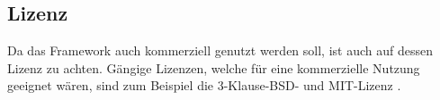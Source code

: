 \subsection{Lizenz}
Da das Framework auch kommerziell genutzt werden soll, ist auch auf dessen Lizenz zu achten. Gängige Lizenzen, welche für eine kommerzielle Nutzung geeignet wären, sind zum Beispiel die 3-Klause-BSD- \cite{3rdclausebsd} und MIT-Lizenz \cite{mit}.